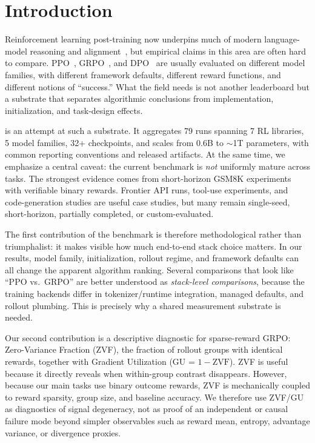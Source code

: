 \section{Introduction}
\label{sec:intro}

Reinforcement learning post-training now underpins much of modern
language-model reasoning and alignment~\citep{ouyang2022training,%
guo2025deepseekr1nature}, but empirical claims in this area are often hard to
compare. PPO~\citep{schulman2017proximal}, GRPO~\citep{shao2024deepseekmath},
and DPO~\citep{rafailov2024direct} are usually evaluated on different model
families, with different framework defaults, different reward functions, and
different notions of ``success.'' What the field needs is not another
leaderboard but a substrate that separates algorithmic conclusions from
implementation, initialization, and task-design effects.

\ours{} is an attempt at such a substrate. It aggregates 79 runs spanning 7 RL
libraries, 5 model families, 32+ checkpoints, and scales from 0.6B to
$\sim$1T parameters, with common reporting conventions and released artifacts.
At the same time, we emphasize a central caveat: the current benchmark is
\emph{not} uniformly mature across tasks. The strongest evidence comes from
short-horizon GSM8K experiments with verifiable binary rewards. Frontier API
runs, tool-use experiments, and code-generation studies are useful case
studies, but many remain single-seed, short-horizon, partially completed, or
custom-evaluated.

The first contribution of the benchmark is therefore methodological rather than
triumphalist: it makes visible how much end-to-end stack choice matters. In our
results, model family, initialization, rollout regime, and framework defaults
can all change the apparent algorithm ranking. Several comparisons that look
like ``PPO vs.\ GRPO'' are better understood as \emph{stack-level comparisons},
because the training backends differ in tokenizer/runtime integration, managed
defaults, and rollout plumbing. This is precisely why a shared measurement
substrate is needed.

Our second contribution is a descriptive diagnostic for sparse-reward GRPO:
Zero-Variance Fraction (ZVF), the fraction of rollout groups with identical
rewards, together with Gradient Utilization (GU = $1-\mathrm{ZVF}$). ZVF is
useful because it directly reveals when within-group contrast disappears.
However, because our main tasks use binary outcome rewards, ZVF is mechanically
coupled to reward sparsity, group size, and baseline accuracy. We therefore use
ZVF/GU as diagnostics of signal degeneracy, not as proof of an independent or
causal failure mode beyond simpler observables such as reward mean, entropy,
advantage variance, or divergence proxies.

